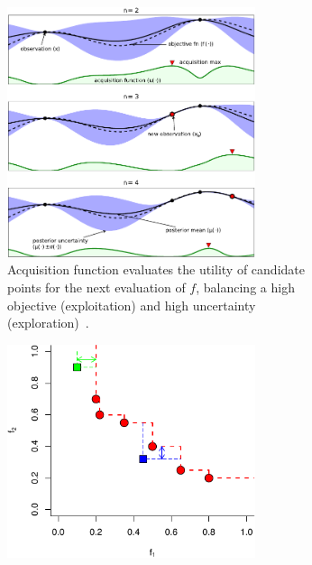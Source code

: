 \begin{figure}
  \begin{subfigure}{0.55\textwidth}
    \centering
    \includegraphics[width=0.8\textwidth]{figures/serving-bo-illustration.pdf}
    \caption{Acquisition function evaluates the utility of candidate points for
      the next evaluation of $f$, balancing a high objective (exploitation) and
      high uncertainty (exploration)~\cite{shahriari2016taking}.}
  \end{subfigure}%
  \hfill
  \begin{subfigure}{0.35\textwidth}
    \centering
    \includegraphics[width=0.8\textwidth]{figures/serving-bo-2d-1.pdf} \\

\end{subfigure}
\end{figure}
